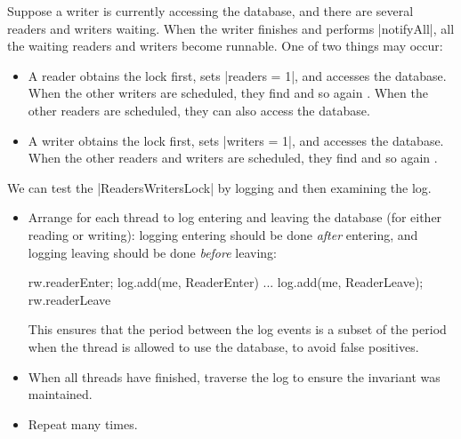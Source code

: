 
\begin{slide}

Suppose a writer is currently accessing the database, and there are several
readers and writers waiting.  When the writer finishes and performs
|notifyAll|, all the waiting readers and writers become runnable.  One of
two things may occur:
%
\begin{itemize}
\item
A reader obtains the lock first, sets |readers = 1|, and accesses the database.
When the other writers are scheduled, they find  and so
again .  When the other readers are scheduled, they can also access
the database.

\item
A writer obtains the lock first, sets |writers = 1|, and accesses the
database.  When the other readers and writers are scheduled, they find
 and so again .
\end{itemize}
\end{slide}


\begin{slide}

We can test the |ReadersWritersLock| by logging and then examining the log.
%
\begin{itemize}
\item Arrange for each thread to log entering and leaving the database
(for either reading or writing): logging entering should be done
\emph{after} entering, and logging leaving should be done
\emph{before} leaving:%
%
\begin{scala}
  rw.readerEnter; log.add(me, ReaderEnter)
  ...
  log.add(me, ReaderLeave); rw.readerLeave
\end{scala}
This ensures that the period between the log events is a subset of the period
when the thread is allowed to use the database, to avoid false positives.
      
\item When all threads have finished, traverse the log to ensure the invariant
was maintained.

\item Repeat many times.
\end{itemize}
%
\end{slide}


